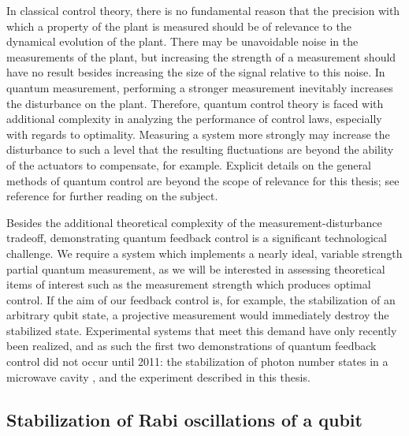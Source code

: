 In classical control theory, there is no fundamental reason that the precision with which a property of the plant is measured should be of relevance to the dynamical evolution of the plant.  There may be unavoidable noise in the measurements of the plant, but increasing the strength of a measurement should have no result besides increasing the size of the signal relative to this noise.  In quantum measurement, performing a stronger measurement inevitably increases the disturbance on the plant.  Therefore, quantum control theory is faced with additional complexity in analyzing the performance of control laws, especially with regards to optimality.  Measuring a system more strongly may increase the disturbance to such a level that the resulting fluctuations are beyond the ability of the actuators to compensate, for example.  Explicit details on the general methods of quantum control are beyond the scope of relevance for this thesis; see reference \cite{qmcontrol_book} for further reading on the subject.

Besides the additional theoretical complexity of the measurement-disturbance tradeoff, demonstrating quantum feedback control is a significant technological challenge.  We require a system which implements a nearly ideal, variable strength partial quantum measurement, as we will be interested in assessing theoretical items of interest such as the measurement strength which produces optimal control.  If the aim of our feedback control is, for example, the stabilization of an arbitrary qubit state, a projective measurement would immediately destroy the stabilized state.  Experimental systems that meet this demand have only recently been realized, and as such the first two demonstrations of quantum feedback control did not occur until 2011: the stabilization of photon number states in a microwave cavity \cite{haroche_fb}, and the experiment described in this thesis.

\subsection{Stabilization of Rabi oscillations of a qubit}

